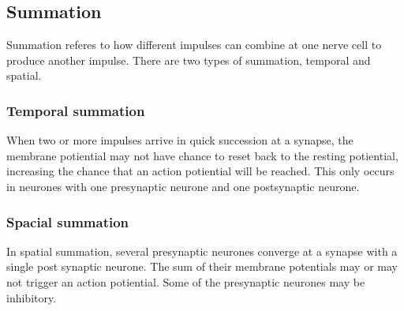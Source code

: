\documentclass{article}
\begin{document}
\subsection*{Summation}

Summation referes to how different impulses can combine at one nerve cell to
produce another impulse. There are two types of summation, temporal and spatial.

\subsubsection*{Temporal summation}

When two or more impulses arrive in quick succession at a synapse, the membrane
potiential may not have chance to reset back to the resting potiential,
increasing the chance that an action potiential will be reached. This only
occurs in neurones with one presynaptic neurone and one postsynaptic neurone.

\subsubsection*{Spacial summation}

In spatial summation, several presynaptic neurones converge at a synapse with a
single post synaptic neurone. The sum of their membrane potentials may or may
not trigger an action potiential. Some of the presynaptic neurones may be
inhibitory.
\end{document}
